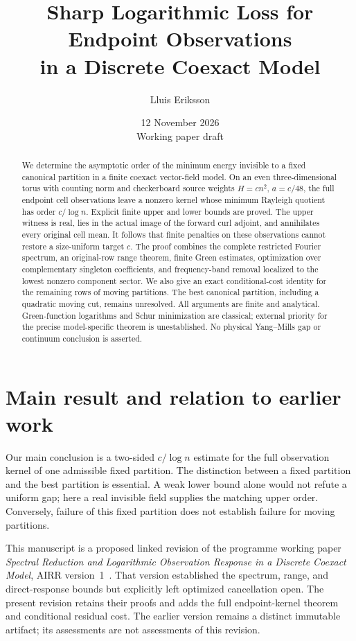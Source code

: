 \documentclass[11pt]{article}
\title{Sharp Logarithmic Loss for Endpoint Observations\\
in a Discrete Coexact Model}
\author{Lluis Eriksson}
\date{12 November 2026\\\small Working paper draft}
\theoremstyle{definition}
\theoremstyle{remark}
\begin{document}
\maketitle
\begin{abstract}
We determine the asymptotic order of the minimum energy invisible to a fixed
canonical partition in a finite coexact vector-field model. On an even
three-dimensional torus with counting norm and checkerboard source weights
$H=cn^2$, $a=c/48$, the full endpoint cell observations leave a nonzero
kernel whose minimum Rayleigh quotient has order $c/\log n$. Explicit finite
upper and lower bounds are proved. The upper witness is real, lies in the
actual image of the forward curl adjoint, and annihilates every original
cell mean. It follows that finite penalties on these observations cannot
restore a size-uniform target $c$. The proof combines the complete restricted
Fourier spectrum, an original-row range theorem, finite Green estimates,
optimization over complementary singleton coefficients, and frequency-band
removal localized to the lowest nonzero component sector. We also give an
exact conditional-cost identity for the remaining rows of moving partitions.
The best canonical partition, including a quadratic moving cut, remains
unresolved. All arguments are finite and analytical. Green-function
logarithms and Schur minimization are classical; external priority for the
precise model-specific theorem is unestablished. No physical Yang--Mills
gap or continuum conclusion is asserted.
\end{abstract}

\section{Main result and relation to earlier work}
Our main conclusion is a two-sided $c/\log n$ estimate for the full
observation kernel of one admissible fixed partition. The distinction
between a fixed partition and the best partition is essential. A weak
lower bound alone would not refute a uniform gap; here a real invisible
field supplies the matching upper order. Conversely, failure of this
fixed partition does not establish failure for moving partitions.

This manuscript is a proposed linked revision of the programme working
paper \emph{Spectral Reduction and Logarithmic Observation Response in a
Discrete Coexact Model}, AIRR version~1~\cite{Eriksson284}. That version
established the spectrum, range, and direct-response bounds but explicitly
left optimized cancellation open. The present revision retains their
proofs and adds the full endpoint-kernel theorem and conditional residual
cost. The earlier version remains a distinct immutable artifact; its
assessments are not assessments of this revision.
\end{document}
